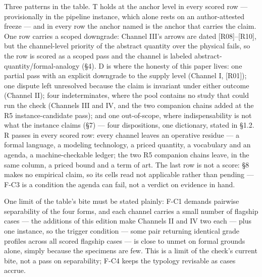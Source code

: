 \documentclass[11pt,a4paper]{article}
\begin{document}
Three patterns in the table. T holds at the anchor level in every scored row — provisionally in the pipeline instance, which alone rests on an author-attested freeze — and in every row the anchor named is the anchor that carries the claim. One row carries a scoped downgrade: Channel III's arrows are dated [R08]–[R10], but the channel-level priority of the abstract quantity over the physical fails, so the row is scored as a scoped pass and the channel is labeled abstract-quantity/formal-analogy (§4). D is where the honesty of this paper lives: one partial pass with an explicit downgrade to the supply level (Channel I, [R01]); one dispute left unresolved because the claim is invariant under either outcome (Channel II); four indeterminates, where the pool contains no study that could run the check (Channels III and IV, and the two companion chains added at the R5 instance-candidate pass); and one out-of-scope, where indispensability is not what the instance claims (§7) — four dispositions, one dictionary, stated in §1.2. R passes in every scored row: every channel leaves an operative residue — a formal language, a modeling technology, a priced quantity, a vocabulary and an agenda, a machine-checkable ledger; the two R5 companion chains leave, in the same column, a priced bound and a term of art. The last row is not a score: §8 makes no empirical claim, so its cells read not applicable rather than pending — F-C3 is a condition the agenda can fail, not a verdict on evidence in hand.

One limit of the table's bite must be stated plainly: F-C1 demands pairwise separability of the four forms, and each channel carries a small number of flagship cases — the additions of this edition make Channels II and IV two each — plus one instance, so the trigger condition — some pair returning identical grade profiles across all scored flagship cases — is close to unmet on formal grounds alone, simply because the specimens are few. This is a limit of the check's current bite, not a pass on separability; F-C4 keeps the typology revisable as cases accrue.
\end{document}
